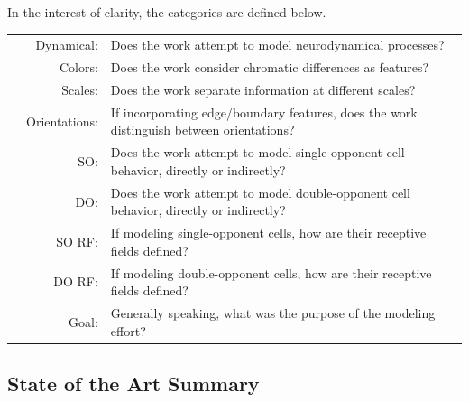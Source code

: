 \documentclass[journal,onecolumn]{IEEEtran}
\begin{document}
\begin{table}[H]
\begin{threeparttable}
    \begin{tablenotes}
        \item In the interest of clarity, the categories are defined below.
        \begin{tabular}{p{1.5cm} r l}
            & Dynamical:    & Does the work attempt to model neurodynamical processes? \\
            & Colors:       & Does the work consider chromatic differences as features? \\
            & Scales:       & Does the work separate information at different scales? \\
            & Orientations: & If incorporating edge/boundary features, does the work distinguish between orientations? \\
            & SO:           & Does the work attempt to model single-opponent cell behavior, directly or indirectly? \\
            & DO:           & Does the work attempt to model double-opponent cell behavior, directly or indirectly? \\
            & SO RF:        & If modeling single-opponent cells, how are their receptive fields defined? \\
            & DO RF:        & If modeling double-opponent cells, how are their receptive fields defined? \\
            & Goal:         & Generally speaking, what was the purpose of the modeling effort?
        \end{tabular}
    \end{tablenotes}
    \end{threeparttable}
\end{table}


\subsection{State of the Art Summary}
\end{document}
